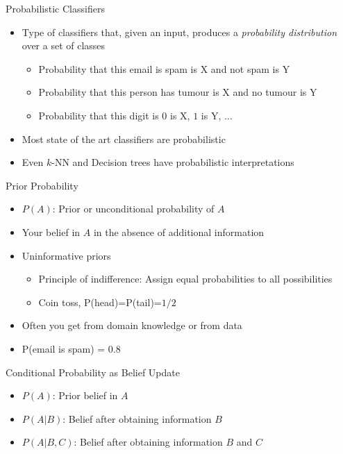 \documentclass{beamer}
\begin{document}
\begin{frame}{Probabilistic Classifiers}
    \begin{itemize}
        \item Type of classifiers that, given an input, produces a {\em probability distribution} over a set of classes 
        \begin{itemize}
            \item Probability that this email is spam is X and not spam is Y
            \item Probability that this person has tumour is X and no tumour is Y
            \item Probability that this digit is $0$ is X, $1$ is Y, $\ldots$
        \end{itemize}
        \item Most state of the art classifiers are probabilistic
        \item Even $k$-NN and Decision trees have probabilistic interpretations
    \end{itemize}
\end{frame}


\begin{frame}{Prior Probability}
    \begin{itemize}
        \item $P(A)$: Prior or unconditional probability of $A$
        \item Your belief in $A$ in the absence of additional information
        \item Uninformative priors
        \begin{itemize}
            \item Principle of indifference: Assign equal probabilities to all possibilities
            \item Coin toss, P(head)=P(tail)=$1/2$
        \end{itemize}
        \item Often you get from domain knowledge or from data 
        \item P(email is spam) = $0.8$
    \end{itemize}
\end{frame}

\begin{frame}{Conditional Probability as Belief Update}
    \begin{itemize}
        \item $P(A)$: Prior belief in $A$
        \item $P(A|B)$: Belief after obtaining information $B$ 
        \item $P(A|B,C)$: Belief after obtaining information $B$  and $C$
    \end{itemize}
\end{frame}
\end{document}
